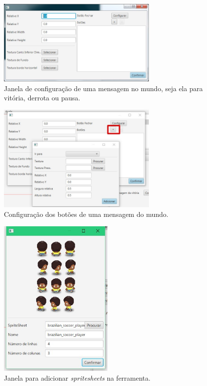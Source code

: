 \documentclass[12pt,oneside,openright,a4paper,english,brazil,sumario=tradicional]{abntex2}
\begin{document}
\begin{anexosenv}
   \begin{figure}[H]
   \centering
   \includegraphics[width=0.7\textwidth]{images/config_msg.jpg}
   \caption{Janela de configuração de uma mensagem no mundo, seja ela para vitória, derrota ou pausa.}
   \label{fig:config_msg}
   \end{figure}

   \begin{figure}[H]
   \centering
   \includegraphics[width=0.7\textwidth]{images/config_msg_2.jpg}
   \caption{Configuração dos botões de uma mensagem do mundo.}
   \label{fig:config_msg_2}
   \end{figure}

   \begin{figure}[H]
   \centering
   \includegraphics[width=0.5\textwidth]{images/add_sprite.jpg}
   \caption{Janela para adicionar \emph{spritesheets} na ferramenta.}
   \label{fig:add_sprite}
   \end{figure}


\end{anexosenv}
\end{document}
